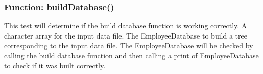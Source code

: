 \documentclass[12pt]{article}%
\newcounter{subsubsubsection}[subsubsection]
\begin{document}
\subsubsection{Function: buildDatabase()}
This test will determine if the build database function is working correctly.
A character array for the input data file.
The EmployeeDatabase to build a tree corresponding to the input data file.
The EmployeeDatabase will be checked by calling the build database function and then calling a print of EmployeeDatabase to check if it was built correctly.
\end{document}
